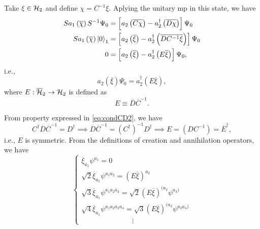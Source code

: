 Take \(\xi\in{\mathcal{H}}_2\) and define \(\chi=C^{-1}\xi\). Aplying the unitary mp in this state, we have
\begin{subequations}
    \begin{align}
        Sa_1\left(\overline{\chi}\right)S^{-1}\Psi_0&=\left[a_2\left(\overline{C\chi}\right)-a_2^{\dagger}\left(\overline{D\chi}\right)\right]\Psi_0\\
        Sa_1\left(\overline{\chi}\right)\ket{0}_1&=\left[a_2\left(\overline{\xi}\right)-a_2^{\dagger}\left(\overline{DC^{-1}\xi}\right)\right]\Psi_0\\
        0&=\left[a_2\left(\overline{\xi}\right)-a_2^{\dagger}\left(E\overline{\xi}\right)\right]\Psi_0,
    \end{align}
\end{subequations}
i.e.,
\begin{equation}
    a_2\left(\overline{\xi}\right)\Psi_0=a^\dagger_2\left(E\overline{\xi}\right),
\end{equation}
where \(E:\overline{{\mathcal{H}}}_2\to{\mathcal{H}}_2\) is defined as 
\begin{equation}
    E\equiv\overline{D}\overline{C}^{-1}.
\end{equation}

From property expressed in \cref{eq:condCD2}, we have
\begin{equation}
    C^{\dagger}\overline{D}\overline{C}^{-1}=D^{\dagger}\implies\overline{D}\overline{C}^{-1}=\left(C^{\dagger}\right)^{-1}D^{\dagger}\implies E=\left(DC^{-1}\right)=\overline{E}^{\dagger},
\end{equation}
i.e., \(E\) is symmetric. From the definitions of creation and annihilation operators, we have
\begin{equation}
    \begin{cases}
        \overline{\xi}_{a_1}\psi^{a_1}=0\\
        \sqrt{2}\overline{\xi}_{a_1}\psi^{a_1a_2}=\left(E\overline{\xi}\right)^{a_2}\\
        \sqrt{3}\overline{\xi}_{a_1}\psi^{a_1a_2a_3}=\sqrt{2}\left(E\overline{\xi}\right)^{(a_2}\psi^{a_3)}\\
        \sqrt{4}\overline{\xi}_{a_1}\psi^{a_1a_2a_3a_4}=\sqrt{3}\left(E\overline{\xi}\right)^{(a_2}\psi^{a_3a_4)}\\
        \hspace{3cm}\vdots
    \end{cases}
\end{equation}

